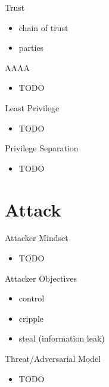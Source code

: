 \documentclass{curs}
\begin{document}
\begin{frame}{Trust}
  \begin{itemize}
    \item chain of trust
    \item parties
  \end{itemize}
\end{frame}

\begin{frame}{AAAA}
  \begin{itemize}
    \item TODO
  \end{itemize}
\end{frame}

\begin{frame}{Least Privilege}
  \begin{itemize}
    \item TODO
  \end{itemize}
\end{frame}

\begin{frame}{Privilege Separation}
  \begin{itemize}
    \item TODO
  \end{itemize}
\end{frame}


\section{Attack}

\begin{frame}{Attacker Mindset}
  \begin{itemize}
    \item TODO
  \end{itemize}
\end{frame}

\begin{frame}{Attacker Objectives}
  \begin{itemize}
    \item control
    \item cripple
    \item steal (information leak)
  \end{itemize}
\end{frame}

\begin{frame}{Threat/Adversarial Model}
  \begin{itemize}
    \item TODO
  \end{itemize}
\end{frame}
\end{document}
